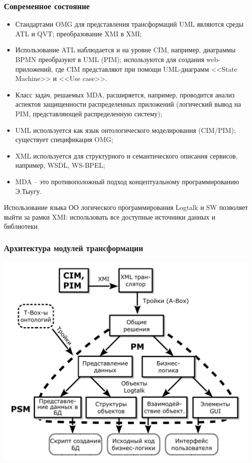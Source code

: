 \documentclass[10pt]{beamer}
\begin{document}
\begin{frame}
  \frametitle{Современное состояние}
  \begin{itemize}
  \item Стандартами OMG для представления трансформаций UML являются среды ATL и QVT; преобразование XMI в XMI;
  \item Использование ATL наблюдается и на уровне CIM, например, диаграммы BPMN преобразуют в UML (PIM); используются для создания web-приложений, где CIM представляют при помощи UML-диаграмм <<State Machine>> и <<Use case>>.
  \item Класс задач, решаемых MDA, расширяется, например, проводится анализ аспектов защищенности распределенных приложений (логический вывод на PIM, представляющей распределенную систему);
  \item UML используется как язык онтологического моделирования (CIM/PIM); существует спецификация OMG; %
  \item XML используется для структурного и семантического описания сервисов, например, WSDL, WS-BPEL;
  \item MDA -- это противоположный подход концептуальному программированию Э.Тыугу.
  \end{itemize}

  Использование языка ОО логического программирования Logtalk и SW позволяет выйти за рамки XMI: использовать все доступные источники данных и библиотеки.
\end{frame}
\begin{frame}
  \frametitle{Архитектура модулей трансформации}
  \centering
  \includegraphics[width=0.9\linewidth]{architect_tree_pres-ru-wo-OCL.pdf}
\end{frame}
\end{document}
